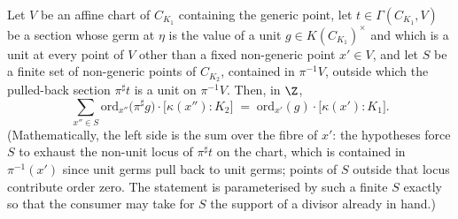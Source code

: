 \begin{theorem}
  \label{thm:sum_ordZ_residueDeg_baseFieldTransition}
  \leanok
  Let \(V\) be an affine chart of \(C_{K_1}\) containing the generic point, let
  \(t \in \Gamma(C_{K_1}, V)\) be a section whose germ at \(\eta\) is the value of a
  unit \(g \in K(C_{K_1})^{\times}\) and which is a unit at every point of \(V\) other
  than a fixed non-generic point \(x' \in V\), and let \(S\) be a finite set of
  non-generic points of \(C_{K_2}\), contained in \(\pi^{-1}V\), outside which the
  pulled-back section \(\pi^{\sharp}t\) is a unit on \(\pi^{-1}V\). Then, in \(\Z\),
  \[
    \sum_{x'' \in S} \mathrm{ord}_{x''}\bigl(\pi^{\sharp}g\bigr) \cdot
      \bigl[\kappa(x'') : K_2\bigr]
    \;=\; \mathrm{ord}_{x'}(g) \cdot \bigl[\kappa(x') : K_1\bigr].
  \]
  (Mathematically, the left side is the sum over the fibre of \(x'\): the hypotheses
  force \(S\) to exhaust the non-unit locus of \(\pi^{\sharp}t\) on the chart, which is
  contained in \(\pi^{-1}(x')\) since unit germs pull back to unit germs; points of
  \(S\) outside that locus contribute order zero. The statement is parameterised by
  such a finite \(S\) exactly so that the consumer may take for \(S\) the support of a
  divisor already in hand.)
\end{theorem}
